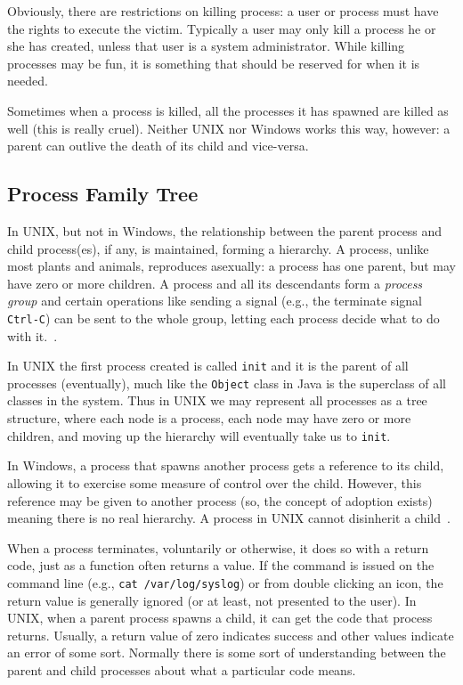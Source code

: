 Obviously, there are restrictions on killing process: a user or process must have the rights to execute the victim. Typically a user may only kill a process he or she has created, unless that user is a system administrator. While killing processes may be fun, it is something that should be reserved for when it is needed.

Sometimes when a process is killed, all the processes it has spawned are killed as well (this is really cruel). Neither UNIX nor Windows works this way, however: a parent can outlive the death of its child and vice-versa.

\subsection*{Process Family Tree}
In UNIX, but not in Windows, the relationship between the parent process and child process(es), if any, is maintained, forming a hierarchy. A process, unlike most plants and animals, reproduces asexually: a process has one parent, but may have zero or more children. A process and all its descendants form a \textit{process group} and certain operations like sending a signal (e.g., the terminate signal \texttt{Ctrl-C}) can be sent to the whole group, letting each process decide what to do with it.~\cite{mos}.

In UNIX the first process created is called \texttt{init} and it is the parent of all processes (eventually), much like the \texttt{Object} class in Java is the superclass of all classes in the system. Thus in UNIX we may represent all processes as a tree structure, where each node is a process, each node may have zero or more children, and moving up the hierarchy will eventually take us to \texttt{init}.

In Windows, a process that spawns another process gets a reference to its child, allowing it to exercise some measure of control over the child. However, this reference may be given to another process (so, the concept of adoption exists) meaning there is no real hierarchy. A process in UNIX cannot disinherit a child~\cite{mos}.

When a process terminates, voluntarily or otherwise, it does so with a return code, just as a function often returns a value. If the command is issued on the command line (e.g., \texttt{cat /var/log/syslog}) or from double clicking an icon, the return value is generally ignored (or at least, not presented to the user). In UNIX, when a parent process spawns a child, it can get the code that process returns. Usually, a return value of zero indicates success and other values indicate an error of some sort. Normally there is some sort of understanding between the parent and child processes about what a particular code means.

